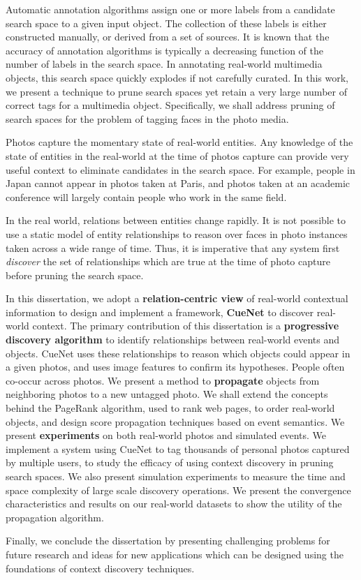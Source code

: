 \thesisabstract
{
Automatic annotation algorithms assign one or more labels from a candidate search space to a given input object. The collection of these labels is either constructed manually, or derived from a set of sources. It is known that the accuracy of annotation algorithms is typically a decreasing function of the number of labels in the search space. In annotating real-world multimedia objects, this search space quickly explodes if not carefully curated. In this work, we present a technique to prune search spaces yet retain a very large number of correct tags for a multimedia object. Specifically, we shall address pruning of search spaces for the problem of tagging faces in the photo media.

Photos capture the momentary state of real-world entities. Any knowledge of the state of entities in the real-world at the time of photos capture can provide very useful context to eliminate candidates in the search space. For example, people in Japan cannot appear in photos taken at Paris, and photos taken at an academic conference will largely contain people who work in the same field. 

In the real world, relations between entities change rapidly. It is not possible to use a static model of entity relationships to reason over faces in photo instances taken across a wide range of time. Thus, it is imperative that any system first \textit{discover} the set of relationships which are true at the time of photo capture before pruning the search space.

In this dissertation, we adopt a \textbf{relation-centric view} of real-world contextual information to design and implement a framework, \textbf{CueNet} to discover real-world context. The primary contribution of this dissertation is a \textbf{progressive discovery algorithm} to identify relationships between real-world events and objects. CueNet uses these relationships to reason which objects could appear in a given photos, and uses image features to confirm its hypotheses. People often co-occur across photos. We present a method to \textbf{propagate} objects from neighboring photos to a new untagged photo. We shall extend the concepts behind the PageRank algorithm, used to rank web pages, to order real-world objects, and design score propagation techniques based on event semantics. We present \textbf{experiments} on both real-world photos and simulated events. We implement a system using CueNet to tag thousands of personal photos captured by multiple users, to study the efficacy of using context discovery in pruning search spaces. We also present simulation experiments to measure the time and space complexity of large scale discovery operations. We present the convergence characteristics and results on our real-world datasets to show the utility of the propagation algorithm. 

Finally, we conclude the dissertation by presenting challenging problems for future research and ideas for new applications which can be designed using the foundations of context discovery techniques.
}


